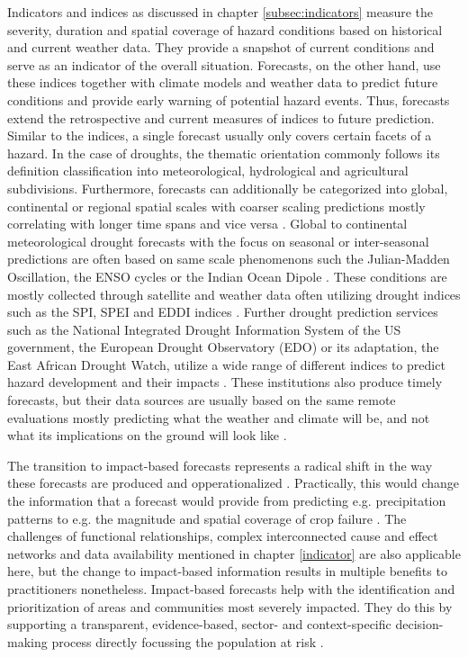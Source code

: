 {Indicators and indices as discussed in chapter \ref*{subsec:indicators} measure the severity, duration and spatial coverage of hazard conditions based on historical and current weather data. They provide a snapshot of current conditions and serve as an indicator of the overall situation. Forecasts, on the other hand, use these indices together with climate models and weather data to predict future conditions and provide early warning of potential hazard events. Thus, forecasts extend the retrospective and current measures of indices to future prediction.
Similar to the indices, a single forecast usually only covers certain facets of a hazard. In the case of droughts, the thematic orientation commonly follows its definition classification into meteorological, hydrological and agricultural subdivisions. Furthermore, forecasts can additionally be categorized into global, continental or regional spatial scales with coarser scaling predictions mostly correlating with longer time spans and vice versa \autocite{baltiReviewDroughtMonitoring2020}. Global to continental meteorological drought forecasts with the focus on seasonal or inter-seasonal predictions are often based on same scale phenomenons such the Julian-Madden Oscillation, the ENSO cycles or the Indian Ocean Dipole \autocite{andersonMaddenJulianOscillationAffects2022,goreUnderstandingInfluenceENSO2020,yuanInfluencesIndianOcean2008}. These conditions are mostly collected through satellite and weather data often utilizing drought indices such as the SPI, SPEI and EDDI indices \autocite{kimIntegratedDroughtMonitoring2021}. Further drought prediction services such as the National Integrated Drought Information System of the US government, the European Drought Observatory (EDO) or its adaptation, the East African Drought Watch, utilize a wide range of different indices to predict hazard development and their impacts \autocite{europeandroughtobservatoryDroughtIndicators2017,icpacDroughtIndicators2023, nidisOutlooksForecasts2023}. These institutions also produce timely forecasts, but their data sources are usually based on the same remote evaluations mostly predicting what the weather and climate will be, and not what its implications on the ground will look like \autocite{enenkelWhyPredictClimate2020}. 

The transition to impact-based forecasts represents a radical shift in the way these forecasts are produced and opperationalized \autocite{ifrcFbFPractitionersManual2023}. Practically, this would change the information that a forecast would provide from predicting e.g. precipitation patterns to e.g. the magnitude and spatial coverage of crop failure \autocite{harrowsmithFutureForecastImpact2020}. The challenges of functional relationships, complex interconnected cause and effect networks and data availability mentioned in chapter \ref*{indicator} are also applicable here, but the change to impact-based information results in multiple benefits to practitioners nonetheless. Impact-based forecasts help with the identification and prioritization of areas and communities most severely impacted. They do this by supporting a transparent, evidence-based, sector- and context-specific decision-making process directly focussing the population at risk \autocite{ifrcFbFPractitionersManual2023}.

}
